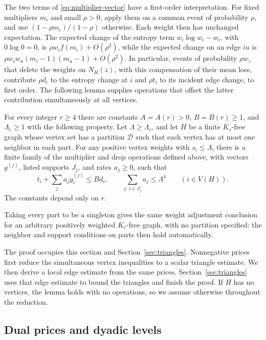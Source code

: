 The two terms of \eqref{eq:multiplier-vector} have a first-order
interpretation.  For fixed multipliers $m_i$ and small $\rho>0$, apply
them on a common event of probability $\rho$, and use
$(1-\rho m_i)/(1-\rho)$ otherwise.  Each weight then has unchanged
expectation.  The expected change of the entropy term
$w_i\log w_i-w_i$, with $0\log0=0$, is
$\rho w_i f(m_i)+O(\rho^2)$, while the
expected change on an edge $iu$ is
$\rho w_iw_u(m_i-1)(m_u-1)+O(\rho^2)$.  In particular, events
of probability $\rho w_z$ that delete the weights on $N_H(z)$,
with this compensation of their mean loss, contribute $\rho d_i$ to
the entropy change at $i$ and $\rho t_i$ to its incident edge change,
to first order.  The following lemma supplies operations that offset
the latter contribution simultaneously at all vertices.

\begin{lemma}
\label{lem:adjustment}
For every integer $r\ge4$ there are constants $A=A(r)>0$,
$B=B(r)\ge1$, and $\Lambda_r\ge1$ with the following property.
Let $\Lambda\ge\Lambda_r$, and let $H$ be a finite $K_r$-free graph
whose vertex set has a partition $\mathcal D$ such that each vertex has
at most one neighbor in each part.  For any positive vertex weights
with $s_i\le\Lambda$, there is a finite family of the multiplier and
drop operations defined above, with vectors $g^{(j)}$, listed supports
$J_j$, and rates $a_j\ge0$, such that
\begin{equation}
\label{eq:adjustment}
 t_i+\sum_j a_jg_i^{(j)}\le B d_i,
 \qquad
 \sum_{j:\,i\in J_j}a_j\le\Lambda^4
 \qquad(i\in V(H)).
\end{equation}
The constants depend only on $r$.
\end{lemma}

Taking every part to be a singleton gives the same weight adjustment
conclusion for an arbitrary positively weighted $K_r$-free graph, with
no partition specified: the neighbor and support conditions on parts
then hold automatically.

The proof occupies this section and Section~\ref{sec:triangles}.
Nonnegative prices first reduce the simultaneous vertex inequalities to
a scalar triangle estimate.  We then derive a local edge estimate from
the same prices.  Section~\ref{sec:triangles} uses that edge estimate to
bound the triangles and finish the proof.  If $H$ has no vertices, the
lemma holds with no operations, so we assume otherwise throughout the
reduction.

\subsection{Dual prices and dyadic levels}

